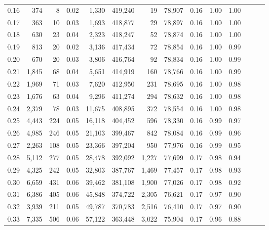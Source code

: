 \begin{tabular}{rrrrrrrrrrrrrr}
0.16 &     374 &      8 &  0.02 &    1,330 &  419,240 &      19 &  78,907 &  0.16 &  1.00 &      1.00 \\
0.17 &     363 &     10 &  0.03 &    1,693 &  418,877 &      29 &  78,897 &  0.16 &  1.00 &      1.00 \\
0.18 &     630 &     23 &  0.04 &    2,323 &  418,247 &      52 &  78,874 &  0.16 &  1.00 &      1.00 \\
0.19 &     813 &     20 &  0.02 &    3,136 &  417,434 &      72 &  78,854 &  0.16 &  1.00 &      0.99 \\
0.20 &     670 &     20 &  0.03 &    3,806 &  416,764 &      92 &  78,834 &  0.16 &  1.00 &      0.99 \\
0.21 &   1,845 &     68 &  0.04 &    5,651 &  414,919 &     160 &  78,766 &  0.16 &  1.00 &      0.99 \\
0.22 &   1,969 &     71 &  0.03 &    7,620 &  412,950 &     231 &  78,695 &  0.16 &  1.00 &      0.98 \\
0.23 &   1,676 &     63 &  0.04 &    9,296 &  411,274 &     294 &  78,632 &  0.16 &  1.00 &      0.98 \\
0.24 &   2,379 &     78 &  0.03 &   11,675 &  408,895 &     372 &  78,554 &  0.16 &  1.00 &      0.98 \\
0.25 &   4,443 &    224 &  0.05 &   16,118 &  404,452 &     596 &  78,330 &  0.16 &  0.99 &      0.97 \\
0.26 &   4,985 &    246 &  0.05 &   21,103 &  399,467 &     842 &  78,084 &  0.16 &  0.99 &      0.96 \\
0.27 &   2,263 &    108 &  0.05 &   23,366 &  397,204 &     950 &  77,976 &  0.16 &  0.99 &      0.95 \\
0.28 &   5,112 &    277 &  0.05 &   28,478 &  392,092 &   1,227 &  77,699 &  0.17 &  0.98 &      0.94 \\
0.29 &   4,325 &    242 &  0.05 &   32,803 &  387,767 &   1,469 &  77,457 &  0.17 &  0.98 &      0.93 \\
0.30 &   6,659 &    431 &  0.06 &   39,462 &  381,108 &   1,900 &  77,026 &  0.17 &  0.98 &      0.92 \\
0.31 &   6,386 &    405 &  0.06 &   45,848 &  374,722 &   2,305 &  76,621 &  0.17 &  0.97 &      0.90 \\
0.32 &   3,939 &    211 &  0.05 &   49,787 &  370,783 &   2,516 &  76,410 &  0.17 &  0.97 &      0.90 \\
0.33 &   7,335 &    506 &  0.06 &   57,122 &  363,448 &   3,022 &  75,904 &  0.17 &  0.96 &      0.88 \\

\end{tabular}
